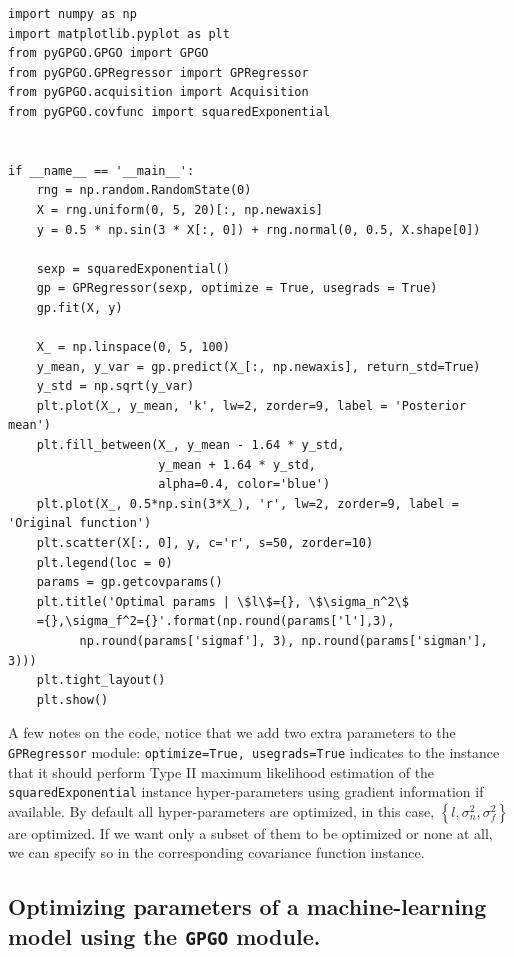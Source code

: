 \documentclass[10pt,a4paper,twoside]{book}
\begin{document}
\begin{verbatim}
import numpy as np
import matplotlib.pyplot as plt
from pyGPGO.GPGO import GPGO
from pyGPGO.GPRegressor import GPRegressor
from pyGPGO.acquisition import Acquisition
from pyGPGO.covfunc import squaredExponential


if __name__ == '__main__':
    rng = np.random.RandomState(0)
    X = rng.uniform(0, 5, 20)[:, np.newaxis]
    y = 0.5 * np.sin(3 * X[:, 0]) + rng.normal(0, 0.5, X.shape[0])

    sexp = squaredExponential()
    gp = GPRegressor(sexp, optimize = True, usegrads = True)
    gp.fit(X, y)

    X_ = np.linspace(0, 5, 100)
    y_mean, y_var = gp.predict(X_[:, np.newaxis], return_std=True)
    y_std = np.sqrt(y_var)
    plt.plot(X_, y_mean, 'k', lw=2, zorder=9, label = 'Posterior mean')
    plt.fill_between(X_, y_mean - 1.64 * y_std,
                     y_mean + 1.64 * y_std,
                     alpha=0.4, color='blue')
    plt.plot(X_, 0.5*np.sin(3*X_), 'r', lw=2, zorder=9, label = 'Original function')
    plt.scatter(X[:, 0], y, c='r', s=50, zorder=10)
    plt.legend(loc = 0)
    params = gp.getcovparams()
    plt.title('Optimal params | \$l\$={}, \$\sigma_n^2\$
    ={},\sigma_f^2={}'.format(np.round(params['l'],3),
    	  np.round(params['sigmaf'], 3), np.round(params['sigman'], 3)))
    plt.tight_layout()
    plt.show()
\end{verbatim}


A few notes on the code, notice that we add two extra parameters to the \texttt{GPRegressor} module: \texttt{optimize=True, usegrads=True} indicates to the instance that it should perform Type II maximum likelihood estimation of the \texttt{squaredExponential} instance hyper-parameters using gradient information if available. By default all hyper-parameters are optimized, in this case, $\left\lbrace l, \sigma_n^2, \sigma_f^2 \right\rbrace$ are optimized. If we want only a subset of them to be optimized or none at all, we can specify so in the corresponding covariance function instance. 



\subsection{Optimizing parameters of a machine-learning model using the \texttt{GPGO} module.}
\end{document}
